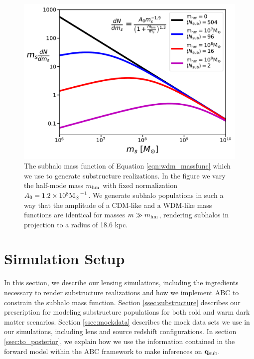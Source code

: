 \begin{figure}
	\centering
	\includegraphics[clip,trim=0cm 0cm 0cm
	0cm,width=.75\textwidth,keepaspectratio]{./figures_ABCforward/mass_function_2.pdf}
	\caption[Example plot of the subhalo mass function]{\label{fig:mass_function} The subhalo mass function of Equation \ref{eqn:wdm_massfunc} which we use to generate substructure realizations. In the figure we vary the half-mode mass $m_{\rm{hm}}$ with fixed normalization $A_0 = 1.2 \times 10^8 {\rm{M}_{\odot}}^{-1}$. We generate subhalo populations in such a way that the amplitude of a CDM-like and a WDM-like mass functions are identical for masses $m \gg m_{\rm{hm}}$, rendering subhalos in projection to a radius of 18.6 kpc.}
\end{figure}

\section{Simulation Setup}
\label{sec:sim_setup}
In this section, we describe our lensing simulations, including the ingredients necessary to render substructure realizations and how we implement ABC to constrain the subhalo mass function. Section \ref{ssec:substructure} describes our prescription for modeling substructure populations for both cold and warm dark matter scenarios. Section \ref{ssec:mockdata} describes the mock data sets we use in our simulations, including lens and source redshift configurations. In section \ref{ssec:to_posterior}, we explain how we use the information contained in the forward model within the ABC framework to make inferences on ${\bf{q}_{\rm{sub}}}$. 

